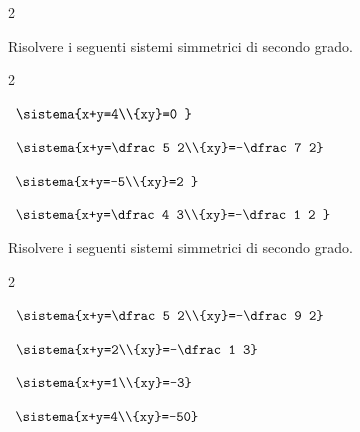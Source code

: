 \begin{esercizio}[*]
\begin{htmulticols}{2}
\begin{enumeratea}
\end{enumeratea}
\end{htmulticols}
\end{esercizio}

\begin{esercizio}[*]
\label{ese:6.18}
Risolvere i seguenti sistemi simmetrici di secondo grado.
\begin{htmulticols}{2}
\begin{enumeratea}
\item~\(\sistema{x+y=4\\{xy}=0 }\)
\sol{}
\item~\(\sistema{x+y=\dfrac 5 2\\{xy}=-\dfrac 7 
2}\)
\item~\(\sistema{x+y=-5\\{xy}=2 }\)
\item~\(\sistema{x+y=\dfrac 4 3\\{xy}=-\dfrac 1 2 
}\)
\end{enumeratea}
\end{htmulticols}
\end{esercizio}

\begin{esercizio}[*]
\label{ese:6.19}
Risolvere i seguenti sistemi simmetrici di secondo grado.
\begin{htmulticols}{2}
\begin{enumeratea}
\item~\(\sistema{x+y=\dfrac 5 2\\{xy}=-\dfrac 9 
2}\)
\item~\(\sistema{x+y=2\\{xy}=-\dfrac 1 
3}\)
\item~\(\sistema{x+y=1\\{xy}=-3}\)
\item~\(\sistema{x+y=4\\{xy}=-50}\)
\end{enumeratea}
\end{htmulticols}
\end{esercizio}

